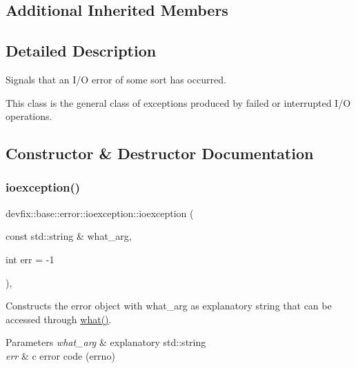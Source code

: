 \subsection*{Additional Inherited Members}


\subsection{Detailed Description}
Signals that an I/O error of some sort has occurred. 

This class is the general class of exceptions produced by failed or interrupted I/O operations. 

\subsection{Constructor \& Destructor Documentation}
\mbox{\label{structdevfix_1_1base_1_1error_1_1ioexception_acaf6aa89dc63021cbf6241b897c570da}} 
\subsubsection{\texorpdfstring{ioexception()}{ioexception()}\hspace{0.1cm}{\footnotesize\ttfamily [1/2]}}
{\footnotesize\ttfamily devfix\+::base\+::error\+::ioexception\+::ioexception (\begin{DoxyParamCaption}\item[{const std\+::string \&}]{what\+\_\+arg,  }\item[{int}]{err = {\ttfamily -\/1} }\end{DoxyParamCaption})\hspace{0.3cm}{\ttfamily [inline]}, {\ttfamily [explicit]}}

Constructs the error object with what\+\_\+arg as explanatory string that can be accessed through \hyperlink{structdevfix_1_1base_1_1error_1_1baseexception_a16327152a55d65b1e537825231fbd452}{what()}. 
\begin{DoxyParams}{Parameters}
{\em what\+\_\+arg} & explanatory std\+::string \\
\hline
{\em err} & c error code (errno) \\
\hline
\end{DoxyParams}
\mbox{\label{structdevfix_1_1base_1_1error_1_1ioexception_a93e7dfc50605b9f6a9c5cd78dac59a44}} 

